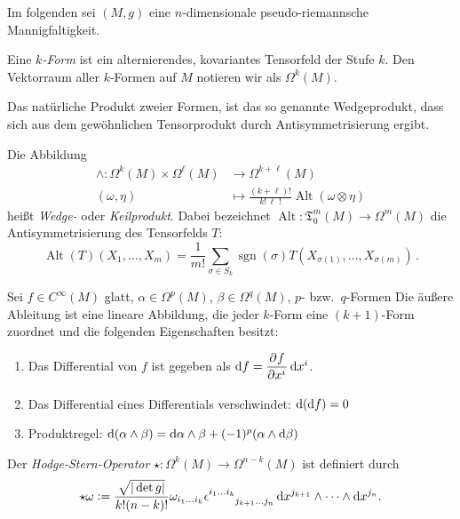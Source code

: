 Im folgenden sei $(M,g)$ eine $n$-dimensionale pseudo-riemannsche
Mannigfaltigkeit.
\begin{definition}[Differentialform]
Eine \emph{$k$-Form} ist ein alternierendes, kovariantes Tensorfeld der Stufe
$k$. Den Vektorraum aller $k$-Formen auf $M$ notieren wir als $\Omega^k(M)$.
\end{definition}
Das natürliche Produkt zweier Formen, ist das so genannte Wedgeprodukt, dass
sich aus dem gewöhnlichen Tensorprodukt durch Antisymmetrisierung ergibt.
\begin{definition}[Wedgeprodukt]
Die Abbildung
\begin{equation}
\begin{split}
\wedge:\Omega^k(M)\times \Omega^\ell(M)&\to \Omega^{k+\ell}(M)\\
(\omega,\eta)&\mapsto\frac{(k+\ell)!}{k!\,\ell\;\!!}\operatorname{Alt}(\omega\otimes\eta)
\end{split}
\end{equation}
heißt \emph{Wedge-} oder \emph{Keilprodukt}.
Dabei bezeichnet $\operatorname{Alt}:\mathfrak{T}^{m}_0(M)\to \Omega^m(M)$ die
 Antisymmetrisierung des Tensorfelds $T$:
\begin{equation}
\operatorname{Alt}(T)\left(X_1,\dots,X_m\right)=\frac{1}{m!}\sum_{\sigma\in
S_k}\operatorname{sgn}(\sigma)T\left(X_{\sigma(1)},\dots,X_{\sigma(m)}\right)\,.
\end{equation}
\end{definition}
\begin{definition}
Sei $f\in C^\infty(M)$ glatt, $\alpha\in \Omega^p(M)$, $\beta\in\Omega^q(M)$,
$p$- bzw.\ $q$-Formen Die äußere Ableitung ist eine lineare Abbildung, die jeder
$k$-Form eine $(k+1)$-Form zuordnet und die
folgenden Eigenschaften besitzt:
\begin{enumerate}
  \item Das Differential von $f$ ist gegeben als $\dif
  f=\dpd{f}{\tensor{x}{^i}}\dif\tensor{x}{^i}$.
  \item Das Differential eines Differentials verschwindet: $\dif\,(\dif f)=0$
  \item Produktregel: $\dif\,(\alpha\wedge \beta)=\dif
  \alpha\wedge\beta+(-1)^p(\alpha\wedge\dif \beta)$
\end{enumerate}

\end{definition}
\begin{definition}
Der \emph{Hodge-Stern-Operator} $\star:\Omega^k(M)\to \Omega^{n-k}(M)$ ist
definiert durch 
\begin{equation}
\star \omega := \frac{\sqrt{\vert \det g \vert}}{k!(n-k)!} 
\omega_{i_1 \dots i_k} 
\tensor{\epsilon}{^{i_1 \dots i_k}_{j_{k+1} \dots j_n}}
\dif x^{j_{k+1}} \wedge \dots \wedge \dif x^{j_n}.
\end{equation}
\end{definition}
